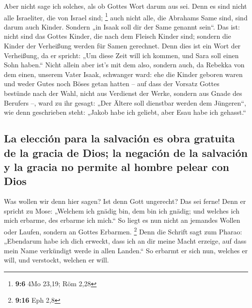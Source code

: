  Aber nicht sage ich solches, als ob Gottes Wort darum aus
sei. Denn es sind nicht alle Israeliter, die von Israel sind;
\footnote{\textbf{9:6} 4Mo 23,19; Röm 2,28}  auch nicht
alle, die Abrahams Same sind, sind darum auch Kinder. Sondern „in Isaak
soll dir der Same genannt sein``.  Das ist: nicht sind das
Gottes Kinder, die nach dem Fleisch Kinder sind; sondern die Kinder der
Verheißung werden für Samen gerechnet.  Denn dies ist ein
Wort der Verheißung, da er spricht: „Um diese Zeit will ich kommen, und
Sara soll einen Sohn haben.``  Nicht allein aber ist's
mit dem also, sondern auch, da Rebekka von dem einen, unserem Vater
Isaak, schwanger ward:  ehe die Kinder geboren waren und
weder Gutes noch Böses getan hatten -- auf dass der Vorsatz Gottes
bestünde nach der Wahl,  nicht aus Verdienst der Werke,
sondern aus Gnade des Berufers --, ward zu ihr gesagt: „Der Ältere soll
dienstbar werden dem Jüngeren``,  wie denn geschrieben
steht: „Jakob habe ich geliebt, aber Esau habe ich gehasst.``

\hypertarget{la-elecciuxf3n-para-la-salvaciuxf3n-es-obra-gratuita-de-la-gracia-de-dios-la-negaciuxf3n-de-la-salvaciuxf3n-y-la-gracia-no-permite-al-hombre-pelear-con-dios}{%
\subsection{La elección para la salvación es obra gratuita de la gracia
de Dios; la negación de la salvación y la gracia no permite al hombre
pelear con
Dios}\label{la-elecciuxf3n-para-la-salvaciuxf3n-es-obra-gratuita-de-la-gracia-de-dios-la-negaciuxf3n-de-la-salvaciuxf3n-y-la-gracia-no-permite-al-hombre-pelear-con-dios}}

 Was wollen wir denn hier sagen? Ist denn Gott ungerecht?
Das sei ferne!  Denn er spricht zu Mose: „Welchem ich
gnädig bin, dem bin ich gnädig; und welches ich mich erbarme, des
erbarme ich mich.``  So liegt es nun nicht an jemandes
Wollen oder Laufen, sondern an Gottes Erbarmen. \footnote{\textbf{9:16}
  Eph 2,8}  Denn die Schrift sagt zum Pharao: „Ebendarum
habe ich dich erweckt, dass ich an dir meine Macht erzeige, auf dass
mein Name verkündigt werde in allen Landen.``  So erbarmt
er sich nun, welches er will, und verstockt, welchen er will.

